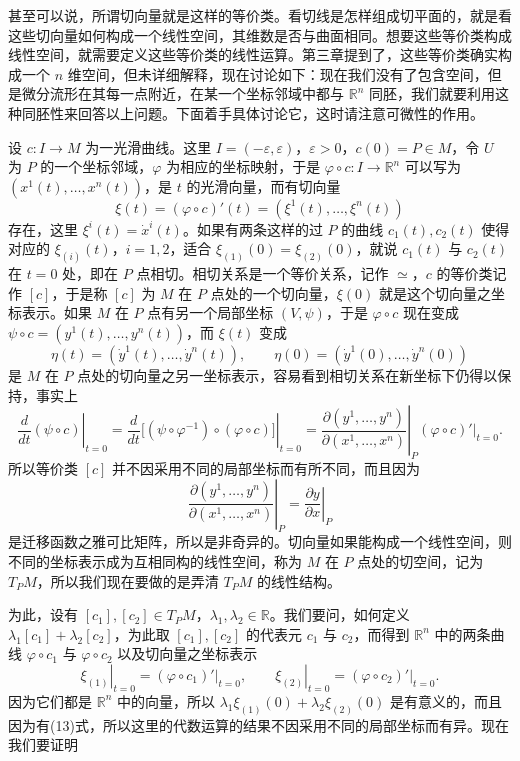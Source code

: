 
甚至可以说，所谓切向量就是这样的等价类。看切线是怎样组成切平面的，就是看这些切向量如何构成一个线性空间，其维数是否与曲面相同。想要这些等价类构成线性空间，就需要定义这些等价类的线性运算。第三章提到了，这些等价类确实构成一个 $n$ 维空间，但未详细解释，现在讨论如下：现在我们没有了包含空间，但是微分流形在其每一点附近，在某一个坐标邻域中都与 $\mathbb R^n$ 同胚，我们就要利用这种同胚性来回答以上问题。下面着手具体讨论它，这时请注意可微性的作用。

设 $c:I\to M$ 为一光滑曲线。这里 $I=(-\varepsilon,\varepsilon)$，$\varepsilon>0$，$c(0)=P\in M$，令 $U$ 为 $P$ 的一个坐标邻域，$\varphi$ 为相应的坐标映射，于是 $\varphi\circ c:I\to\mathbb R^n$ 可以写为 $(x^1(t),\ldots,x^n(t))$，是 $t$ 的光滑向量，而有切向量
\[
 \xi(t)=(\varphi\circ c)'(t)=(\xi^1(t),\ldots,\xi^n(t))
\]
存在，这里 $\xi^i(t)=\dot x^i(t)$。如果有两条这样的过 $P$ 的曲线 $c_1(t),c_2(t)$ 使得对应的 $\xi_{(i)}(t)$，$i=1,2$，适合 $\xi_{(1)}(0)=\xi_{(2)}(0)$，就说 $c_1(t)$ 与 $c_2(t)$ 在 $t=0$ 处，即在 $P$ 点相切。相切关系是一个等价关系，记作 $\simeq$，$c$ 的等价类记作 $[c]$，于是称 $[c]$ 为 $M$ 在 $P$ 点处的一个切向量，$\xi(0)$ 就是这个切向量之坐标表示。如果 $M$ 在 $P$ 点有另一个局部坐标 $(V,\psi)$，于是 $\varphi\circ c$ 现在变成 $\psi\circ c=(y^1(t),\ldots,y^n(t))$，而 $\xi(t)$ 变成
\[
 \eta(t)=(\dot y^1(t),\ldots,\dot y^n(t)),\qquad
 \eta(0)=(\dot y^1(0),\ldots,\dot y^n(0))
\]
是 $M$ 在 $P$ 点处的切向量之另一坐标表示，容易看到相切关系在新坐标下仍得以保持，事实上
\begin{equation}
 \left.\frac{d}{dt}(\psi\circ c)\right|_{t=0}
 =\left.\frac{d}{dt}\bigl[(\psi\circ\varphi^{-1})\circ(\varphi\circ c)\bigr]\right|_{t=0}
 =\left.\frac{\partial(y^1,\ldots,y^n)}{\partial(x^1,\ldots,x^n)}\right|_P
 \left.(\varphi\circ c)'\right|_{t=0}.
 \tag{13}
\end{equation}
所以等价类 $[c]$ 并不因采用不同的局部坐标而有所不同，而且因为
\[
 \left.\frac{\partial(y^1,\ldots,y^n)}{\partial(x^1,\ldots,x^n)}\right|_P
 =\left.\frac{\partial y}{\partial x}\right|_P
\]
是迁移函数之雅可比矩阵，所以是非奇异的。切向量如果能构成一个线性空间，则不同的坐标表示成为互相同构的线性空间，称为 $M$ 在 $P$ 点处的切空间，记为 $T_PM$，所以我们现在要做的是弄清 $T_PM$ 的线性结构。

为此，设有 $[c_1],[c_2]\in T_PM$，$\lambda_1,\lambda_2\in\mathbb R$。我们要问，如何定义 $\lambda_1[c_1]+\lambda_2[c_2]$，为此取 $[c_1],[c_2]$ 的代表元 $c_1$ 与 $c_2$，而得到 $\mathbb R^n$ 中的两条曲线 $\varphi\circ c_1$ 与 $\varphi\circ c_2$ 以及切向量之坐标表示
\[
 \left.\xi_{(1)}\right|_{t=0}=\left.(\varphi\circ c_1)'\right|_{t=0},\qquad
 \left.\xi_{(2)}\right|_{t=0}=\left.(\varphi\circ c_2)'\right|_{t=0}.
\]
因为它们都是 $\mathbb R^n$ 中的向量，所以 $\lambda_1\xi_{(1)}(0)+\lambda_2\xi_{(2)}(0)$ 是有意义的，而且因为有(13)式，所以这里的代数运算的结果不因采用不同的局部坐标而有异。现在我们要证明

